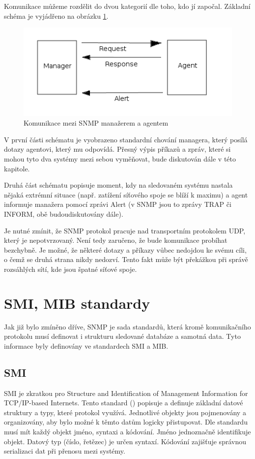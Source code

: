 Komunikace můžeme rozdělit do dvou kategorií dle toho, kdo jí započal. Základní schéma je vyjádřeno na obrázku \ref{obr_snmp2}.

\begin{figure}[htp]
	\begin{center}
		\includegraphics[width=12cm]{obrazky/02_snmp_communication.png}
		\caption{Komunikace mezi SNMP manažerem a agentem}
		\label{obr_snmp2}
	\end{center}
\end{figure}

V první části schématu je vyobrazeno standardní chování managera, který posílá dotazy agentovi, který mu odpovídá. Přesný výpis příkazů a zpráv, které si mohou tyto dva systémy mezi sebou vyměňovat, bude 
diskutován dále v této kapitole.

Druhá část schématu popisuje moment, kdy na sledovaném systému nastala nějaká extrémní situace (např. zatížení síťového spoje se blíží k maximu) a agent informuje manažera pomocí zprávi Alert (v SNMP jsou to zprávy
TRAP či INFORM, obě budoudiskutovány dále).

Je nutné zmínit, že SNMP protokol pracuje nad transportním protokolem UDP, který je nepotvrzovaný. Není tedy zaručeno, že bude komunikace probíhat bezchybně. Je možné, že některé dotazy a příkazy vůbec nedojdou
ke svému cíli, o čemž se druhá strana nikdy nedozví. Tento fakt může být překážkou při správě rozsáhlých sítí, kde jsou špatné síťové spoje.


\section{SMI, MIB standardy}
Jak již bylo zmíněno dříve, SNMP je sada standardů, která kromě komunikačního protokolu musí definovat i strukturu sledované databáze a samotná data. Tyto informace byly definovány ve standardech SMI a MIB.

\subsection*{SMI}
SMI je zkratkou pro Structure and Identification of Management Information for TCP/IP-based Internets. Tento standard (\cite{RFC1155}) popisuje a definuje základní datové struktury a typy, které protokol využívá.
Jednotlivé objekty jsou pojmenovány a organizovány, aby bylo možné k těmto datům logicky přistupovat. Dle standardu musí mít každý objekt jméno, syntaxi a kódování. Jméno jednoznačně identifikuje objekt. Datový typ
(číslo, řetězec) je určen syntaxí. Kódování zajišťuje správnou serializaci dat při přenosu mezi systémy.

